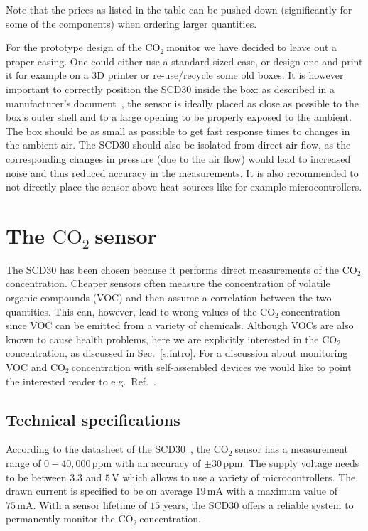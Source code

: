 \documentclass[12pt,a4paper]{article}
\newcommand{\coo}{\ensuremath{\mathrm{CO_2}~}}
\begin{document}
Note that the prices as listed in the table can be pushed down (significantly for some of the components) when ordering larger quantities. 

For the prototype design of the \coo monitor we have decided to leave out a proper casing. One could either use a standard-sized case, or design one and print it for example on a 3D printer or re-use/recycle some old boxes. It is however important to correctly position the SCD30 inside the box: as described in a manufacturer's document~\cite{SENSIRION2020A}, the sensor is ideally placed as close as possible to the box's outer shell and to a large opening to be properly exposed to the ambient. The box should be as small as possible to get fast response times to changes in the ambient air. The SCD30 should also be isolated from direct air flow, as the corresponding changes in pressure (due to the air flow) would lead to increased noise and thus reduced accuracy in the measurements. It is also recommended to not directly place the sensor above heat sources like for example microcontrollers.


\section{The \coo sensor}
The SCD30 has been chosen because it performs direct measurements of the \coo concentration. Cheaper sensors often measure the concentration of volatile organic compounds (VOC) and then assume a correlation between the two quantities. This can, however, lead to wrong values of the \coo concentration since VOC can be emitted from a variety of chemicals. Although VOCs are also known to cause health problems, here we are explicitly interested in the \coo concentration, as discussed in Sec.~\ref{s:intro}. For a discussion about monitoring VOC and \coo concentration with self-assembled devices we would like to point the interested reader 
to e.g.\ Ref.~\cite{CHIESA2019}.

\subsection{Technical specifications}
According to the datasheet of the SCD30~\cite{SENSIRION2020B}, the \coo sensor has a measurement range of $0 - 40,000\,\mathrm{ppm}$ with an accuracy of $\pm 30\,\mathrm{ppm}$.
The supply voltage needs to be between $3.3$ and $5\,\mathrm{V}$ which allows to use a variety of microcontrollers. The drawn current is specified to be on average $19\,\mathrm{mA}$ with a maximum value of $75\,\mathrm{mA}$. With a sensor lifetime of $15$ years, the SCD30 offers a reliable system to permanently monitor the \coo concentration.
\end{document}

